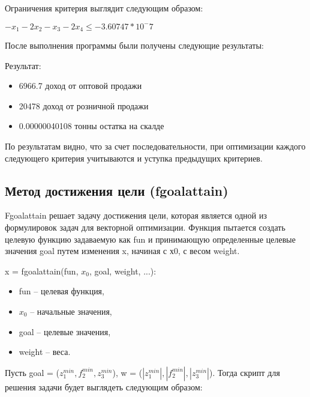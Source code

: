 \documentclass[14pt,a4paper,report]{report}
\begin{document}
Ограничения критерия выглядит следующим образом:

\begin{center}
$-x_1-2x_2-x_3-2x_4\leq -3.60747 * 10^-7$
\end{center}



После выполнения программы были получены следующие результаты:



Результат:
\begin{itemize}
\item 6966.7 доход от оптовой продажи
\item 20478 доход от розничной продажи
\item 0.00000040108 тонны остатка на скалде
\end{itemize}

По результатам видно, что за счет последовательности, при оптимизации каждого следующего критерия учитываются и уступка предыдущих критериев.















\subsection{Метод достижения цели (fgoalattain)}
Fgoalattain решает задачу достижения цели, которая является одной из формулировок задач для векторной оптимизации. Функция пытается создать целевую функцию задаваемую как fun и принимающую определенные целевые значения goal путем изменения x, начиная с х0, с весом weight.

x = fgoalattain(fun, $x_0$, goal, weight, ...):
\begin{itemize}
\item fun – целевая функция,
\item $x_0$ – начальные значения,
\item goal – целевые значения,
\item weight – веса.
\end{itemize}

Пусть goal = ($z_1^{min}, f_2^{min}, z_3^{min}$), w = ($|z_1^{min}|, |f_2^{min}|, |z_3^{min}|$). Тогда скрипт для решения задачи будет выглядеть следующим образом:


\end{document}
